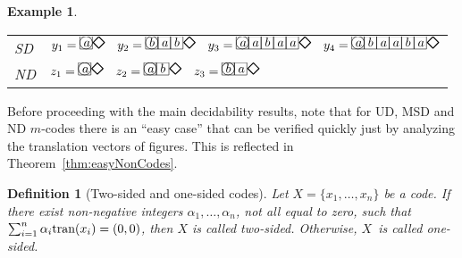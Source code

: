 \documentclass[final,nomarks]{dmtcs-episciences}
\newcommand{\dfimglabel}[3]{
    \put(#1,#2){
        \put(0,0){\line(1,0){10}}
        \put(0,0){\line(0,1){10}}
        \put(10,10){\line(-1,0){10}}
        \put(10,10){\line(0,-1){10}}
        \put(3,2){$#3$}
    }
}
\newcommand{\dfimgbegin}[2]{
    \put(#1,#2){
        \put(5,5){\circle{10}}
    }
}
\newcommand{\dfimgend}[2]{
    \put(#1,#2){
        \put(0,0){{\huge $\diamond$}}
    }
}
\newcommand{\dfimgbeginlabel}[3]{
    \dfimglabel{#1}{#2}{#3}
    \dfimgbegin{#1}{#2}
}
\newcommand{\dftransition}[1]{\mbox{\rm tran}(#1)}
\newtheorem{definition}{Definition}
\newtheorem{example}{Example}
\begin{document}
\begin{example}
\begin{center}
\begin{tabular}{ll}
SD &
$y_1=\begin{picture}(20,5)
    \dfimgbeginlabel{00}{00}{a}
    \dfimgend{10}{00}
\end{picture}~~~
y_2=\begin{picture}(40,5)
    \dfimgbeginlabel{00}{00}{b}
    \dfimglabel{10}{00}{a}
    \dfimglabel{20}{00}{b}
    \dfimgend{30}{00}
\end{picture}~~~
y_3=\begin{picture}(60,5)
    \dfimgbeginlabel{00}{00}{a}
    \dfimglabel{10}{00}{a}
    \dfimglabel{20}{00}{b}
    \dfimglabel{30}{00}{a}
    \dfimglabel{40}{00}{a}
    \dfimgend{50}{00}
\end{picture}~~~
y_4=\begin{picture}(70,5)
    \dfimgbeginlabel{00}{00}{a}
    \dfimglabel{10}{00}{b}
    \dfimglabel{20}{00}{a}
    \dfimglabel{30}{00}{a}
    \dfimglabel{40}{00}{b}
    \dfimglabel{50}{00}{a}
    \dfimgend{60}{00}
\end{picture}$\\[1ex]
ND &
$z_1=\begin{picture}(20,5)
    \dfimgbeginlabel{00}{00}{a}
    \dfimgend{10}{00}
\end{picture}~~~
z_2=\begin{picture}(30,5)
    \dfimgbeginlabel{00}{00}{a}
    \dfimglabel{10}{00}{b}
    \dfimgend{20}{00}
\end{picture}~~~
z_3=\begin{picture}(30,5)
    \dfimgbeginlabel{00}{00}{b}
    \dfimglabel{10}{00}{a}
    \dfimgend{20}{00}
\end{picture}$
\end{tabular}
\end{center}
\end{example}
\medskip

Before proceeding with the main decidability results, note that
for UD, MSD and ND $m$-codes there is an ``easy case'' that can
be verified quickly just by analyzing the translation vectors of
figures. This is reflected in Theorem~\ref{thm:easyNonCodes}.


\begin{definition}[Two-sided and one-sided codes]
Let $X=\{x_1,\ldots,x_n\}$ be a code. If there exist non-negative integers
$\alpha_1,\ldots,\alpha_n$, not all equal to zero, such
that $\sum_{i=1}^n\alpha_i\dftransition{x_i}=(0,0)$,
then $X$ is called \emph{two-sided}. 
Otherwise, $X$~is called \emph{one-sided}.
\end{definition}
\end{document}
